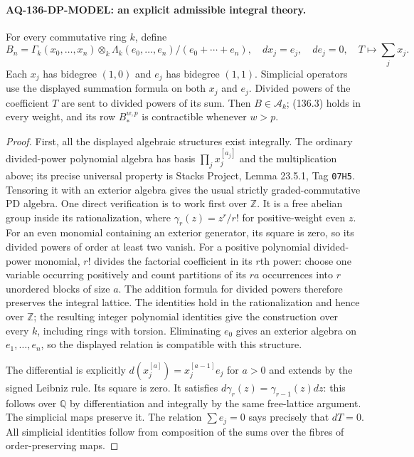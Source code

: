 \documentclass[11pt,a4paper]{article}
\theoremstyle{definition}\newtheorem{definition}[theorem]{Definition}
\theoremstyle{remark}\newtheorem{remark}[theorem]{Remark}
\begin{document}
\paragraph{AQ-136-DP-MODEL: an explicit admissible integral theory.}
For every commutative ring $k$, define
\[
 B_n=\Gamma_k(x_0,\ldots,x_n)
       \otimes_k\Lambda_k(e_0,\ldots,e_n)/(e_0+\cdots+e_n),
 \quad dx_j=e_j,\quad de_j=0,\quad T\mapsto\sum_jx_j .        \tag{136.5}
\]
Each $x_j$ has bidegree $(1,0)$ and $e_j$ has bidegree
$(1,1)$.  Simplicial operators use the displayed summation
formula on both $x_j$ and $e_j$.  Divided powers of the
coefficient $T$ are sent to divided powers of its sum.
Then $B\in\mathcal A_k$; (136.3) holds in every weight,
and its row $B^{w,p}_*$ is contractible whenever $w>p$.

\begin{proof}
First, all the displayed algebraic structures exist integrally.
The ordinary divided-power polynomial algebra has basis
$\prod_jx_j^{[a_j]}$ and the multiplication above; its precise
universal property is Stacks Project, Lemma 23.5.1,
Tag \nolinkurl{07H5}.  Tensoring it with an exterior algebra
gives the usual strictly graded-commutative PD algebra.
One direct verification is to work first over $\mathbb Z$.
It is a free abelian group inside its rationalization, where
$\gamma_r(z)=z^r/r!$ for positive-weight even $z$.
For an even monomial containing an exterior generator, its
square is zero, so its divided powers of order at least two
vanish.  For a positive polynomial divided-power monomial,
$r!$ divides the factorial coefficient in its $r$th power:
choose one variable occurring positively and count partitions
of its $ra$ occurrences into $r$ unordered blocks of size $a$.
The addition formula for divided powers therefore preserves
the integral lattice.  The identities hold in the
rationalization and hence over $\mathbb Z$; the resulting
integer polynomial identities give the construction over every
$k$, including rings with torsion.  Eliminating $e_0$ gives
an exterior algebra on $e_1,\ldots,e_n$, so the displayed
relation is compatible with this structure.

The differential is explicitly
$d(x_j^{[a]})=x_j^{[a-1]}e_j$ for $a>0$ and extends by the
signed Leibniz rule.  Its square is zero.  It satisfies
$d\gamma_r(z)=\gamma_{r-1}(z)dz$: this follows over
$\mathbb Q$ by differentiation and integrally by the same
free-lattice argument.  The simplicial maps preserve it.
The relation $\sum e_j=0$ says precisely that $dT=0$.
All simplicial identities follow from composition of the
sums over the fibres of order-preserving maps.


\end{proof}
\end{document}
